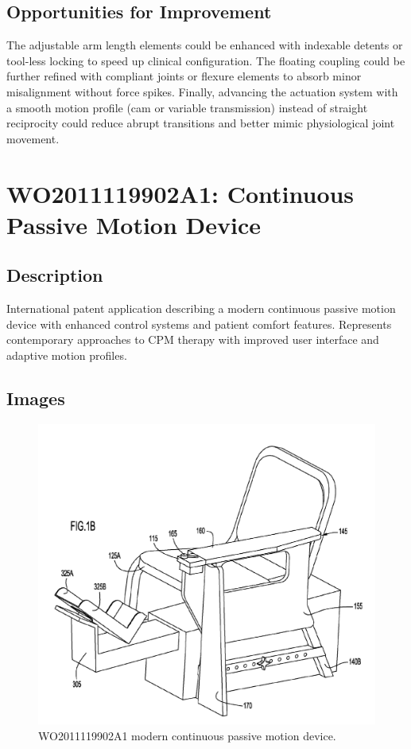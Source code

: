 \documentclass[11pt]{article}
\begin{document}
\subsection{Opportunities for Improvement}
The adjustable arm length elements could be enhanced with indexable detents or tool-less locking to speed up clinical configuration. The floating coupling could be further refined with compliant joints or flexure elements to absorb minor misalignment without force spikes. Finally, advancing the actuation system with a smooth motion profile (cam or variable transmission) instead of straight reciprocity could reduce abrupt transitions and better mimic physiological joint movement.

\section{WO2011119902A1: Continuous Passive Motion Device}
\subsection{Description}
International patent application describing a modern continuous passive motion device with enhanced control systems and patient comfort features. Represents contemporary approaches to CPM therapy with improved user interface and adaptive motion profiles.
\subsection{Images}
\begin{figure}[H]
  \centering
  \includegraphics[width=0.54\linewidth]{WO2011119902A1.png}
  \caption{WO2011119902A1 modern continuous passive motion device.}
  \label{fig:WO2011119902A1}
\end{figure}
\end{document}
